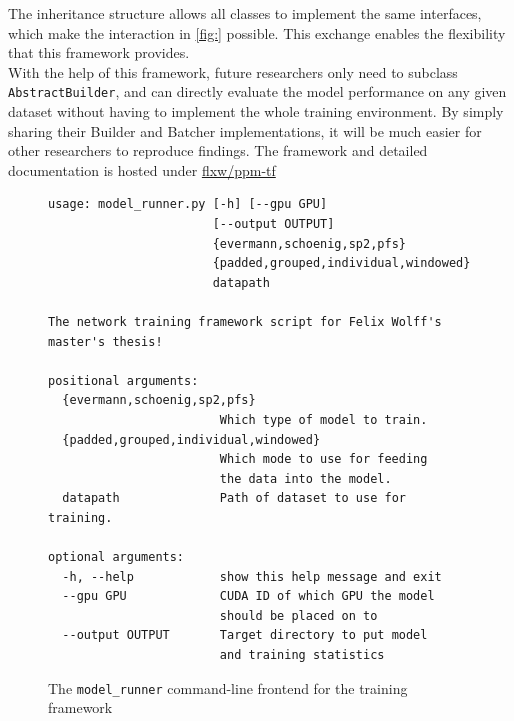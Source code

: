 The inheritance structure allows all classes to implement the same interfaces, which make the interaction in \autoref{fig:} possible. This exchange enables the flexibility that this framework provides.\\

With the help of this framework, future researchers only need to subclass \verb=AbstractBuilder=, and can directly evaluate the model performance on any given dataset without having to implement the whole training environment. By simply sharing their Builder and Batcher implementations, it will be much easier for other researchers to reproduce findings. The framework and detailed documentation is hosted under \href{https://github.com/flxw/ppm-tf}{flxw/ppm-tf}

\begin{figure}
\centering
\begin{verbatim}
usage: model_runner.py [-h] [--gpu GPU]
                       [--output OUTPUT]
                       {evermann,schoenig,sp2,pfs}
                       {padded,grouped,individual,windowed}
                       datapath

The network training framework script for Felix Wolff's master's thesis!

positional arguments:
  {evermann,schoenig,sp2,pfs}
                        Which type of model to train.
  {padded,grouped,individual,windowed}
                        Which mode to use for feeding
                        the data into the model.
  datapath              Path of dataset to use for training.

optional arguments:
  -h, --help            show this help message and exit
  --gpu GPU             CUDA ID of which GPU the model
                        should be placed on to
  --output OUTPUT       Target directory to put model
                        and training statistics
\end{verbatim}
\caption[CLI frontend for the framework]{The \texttt{model\_runner} command-line frontend for the training framework}
\label{fig:framework-frontend}
\end{figure}
